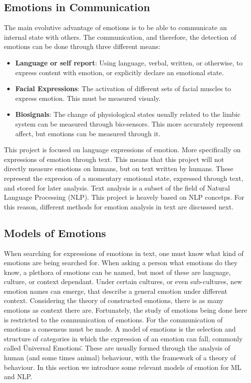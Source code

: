 \subsection{Emotions in Communication}\label{sub:Emotions in Communication}
The main evolutive advantage of emotions is to be able to communicate an internal state with others. The communication, and therefore, the detection of emotions can be done through three different means:
\begin{itemize}
  \item \textbf{Language or self report}: Using language, verbal, written, or otherwise, to express content with emotion, or explicitly declare an emotional state.
  \item \textbf{Facial Expressions}: The activation of different sets of facial muscles to express emotion. This must be measured visualy.
  \item \textbf{Biosignals}: The change of physiological states usually related to the limbic system can be measured through bio-sensors. This more accurately represent affect, but emotions can be measured through it.
\end{itemize}

This project is focused on language expressions of emotion. More specifically on expressions of emotion through text. This means that this project will not directly measure emotions on humans, but on text written by humans. These represent the expresion of a momentary emotional state, expressed through text, and stored for later analysis. Text analysis is a subset of the field of Natural Language Processing (NLP). This project is heavely based on NLP concetps. For this reason, different methods for emotion analysis in text are discussed next.

\subsection{Models of Emotions}\label{sub:Models of Emotions}
When searching for expressions of emotions in text, one must know what kind of emotions are being searched for. When asking a person what emotions do they know, a plethora of emotions can be named, but most of these are language, culture, or context dependant. Under certain cultures, or even sub-cultures, new emotion names can emerge, that describe a general emotion under different context. Considering the theory of constructed emotions, there is as many emotions as context there are. Fortunately, the study of emotions being done here is restricted to the communication of emotions. For the communication of emotions a consensus must be made.
A model of emotions is the selection and structure of categories in which the expression of an emotion can fall, commonly called \"Universal Emotions\". These are usually formed through the analysis of human (and some times animal) behaviour, with the framework of a theory of behaviour. In this section we introduce some relevant models of emotion for ML and NLP.

